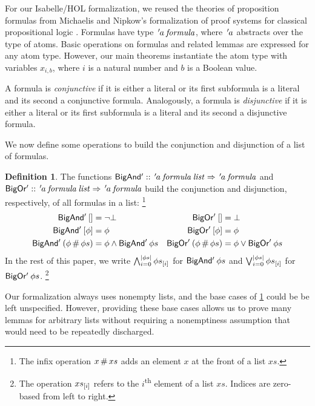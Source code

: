 \documentclass[a4paper,USenglish,cleveref, autoref, thm-restate]{lipics-v2021}
\theoremstyle{definition}
\newtheorem{definitionx}[theorem]{Definition}
\begin{document}
For our Isabelle/HOL formalization, we reused the theories of proposition formulas from Michaelis and Nipkow's formalization of proof systems for classical propositional logic \cite{Propositional_Proof_Systems-AFP,Michaelis_Nipkow_TYPES2017}.
Formulas have type ${\thinspace'}{\kern-.175ex a} \> \mathit{formula}$, where ${\thinspace'}{\kern-.175ex a}$ abstracts over the type of atoms.
Basic operations on formulas and related lemmas are expressed for any atom type.
However, our main theorems instantiate the atom type with variables $x_{i,b}$, where $i$ is a natural number and $b$ is a Boolean value.

A formula is \emph{conjunctive} if it is either a literal or its first subformula is a literal and its second a conjunctive formula.
Analogously, a formula is \emph{disjunctive} if it is either a literal or its first subformula is a literal and its second a disjunctive formula.

We now define some operations to build the conjunction and disjunction of a list of formulas.

\begin{definitionx}
  \label{def_BigOr_BigAnd}
  The functions
  $\mathsf{BigAnd'} \mathrel{::} {\thinspace'}{\kern-.175ex a} \> \mathit{formula} \> \mathit{list} \Rightarrow {\thinspace'}{\kern-.175ex a} \> \mathit{formula}$ and
  $\mathsf{BigOr'} \mathrel{::} {\thinspace'}{\kern-.175ex a} \> \mathit{formula} \> \mathit{list} \Rightarrow {\thinspace'}{\kern-.175ex a} \> \mathit{formula}$
  build the conjunction and disjunction, respectively, of all formulas in a list:%
  \footnote{The infix operation $x \mathop{\#} xs$ adds an element $x$ at the front of a list $xs$.}
  \begin{align*}
    \mathsf{BigAnd'} \> [] =\; & \neg\bot &
    \mathsf{BigOr'} \> [] =\; & \bot \\
    \mathsf{BigAnd'} \> [\phi] =\; & \phi &
    \mathsf{BigOr'} \> [\phi] =\; & \phi \\
    \mathsf{BigAnd'} \> (\phi \mathop{\#} \phi{}s) =\; & \phi \land \mathsf{BigAnd'} \> \phi{}s &
    \mathsf{BigOr'} \> (\phi \mathop{\#} \phi{}s) =\; & \phi \lor \mathsf{BigOr'} \> \phi{}s
  \end{align*}
  In the rest of this paper, we write
  $\bigwedge_{i = 0}^{\left|\phi{}s\right|} {\phi{}s}_{[i]}$ for $\mathsf{BigAnd'} \> \phi{}s$ and
  $\bigvee_{i = 0}^{\left|\phi{}s\right|} {\phi{}s}_{[i]}$ for $\mathsf{BigOr'} \> \phi{}s$.%
  \footnote{The operation ${xs}_{[i]}$ refers to the $i$\textsuperscript{th} element of a list $xs$. Indices are zero-based from left to right.}
\end{definitionx}

\begin{remark*}
  Our formalization always uses nonempty lists, and the base cases of \cref{def_BigOr_BigAnd} could be be left unspecified.
  However, providing these base cases allows us to prove many lemmas for arbitrary lists without requiring a nonemptiness assumption that would need to be repeatedly discharged.
\end{remark*}
\end{document}
